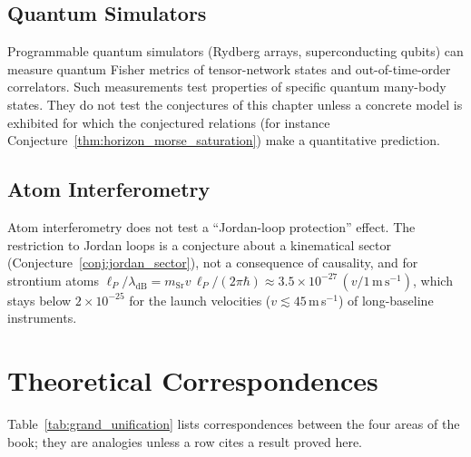 \documentclass[11pt,a4paper,reqno]{amsart}
\theoremstyle{definition}
\numberwithin{equation}{section}
\begin{document}
\subsection{Quantum Simulators}
Programmable quantum simulators (Rydberg arrays, superconducting qubits) can measure quantum Fisher metrics of tensor-network states and out-of-time-order correlators. Such measurements test properties of specific quantum many-body states. They do not test the conjectures of this chapter unless a concrete model is exhibited for which the conjectured relations (for instance Conjecture~\ref{thm:horizon_morse_saturation}) make a quantitative prediction.

\subsection{Atom Interferometry}
Atom interferometry does not test a ``Jordan-loop protection'' effect. The restriction to Jordan loops is a conjecture about a kinematical sector (Conjecture~\ref{conj:jordan_sector}), not a consequence of causality, and for strontium atoms $\ell_P/\lambda_{\mathrm{dB}} = m_{\mathrm{Sr}} v\, \ell_P/(2\pi\hbar) \approx 3.5 \times 10^{-27}\,(v/1\,\mathrm{m\,s^{-1}})$, which stays below $2 \times 10^{-25}$ for the launch velocities ($v \lesssim 45$\,m\,s$^{-1}$) of long-baseline instruments.

\section{Theoretical Correspondences}
\label{sec:master_table}

Table~\ref{tab:grand_unification} lists correspondences between the four areas of the book; they are analogies unless a row cites a result proved here.
\end{document}
